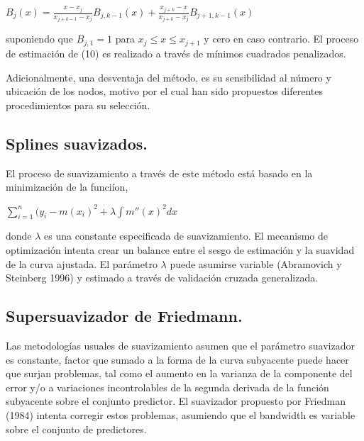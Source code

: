 \vspace*{0.2 cm}


\begin{center}
$\displaystyle{ B_{j}(x) = \frac{x-x_{j}}{x_{j+k-1}-x_{j}} B_{j,k-1}(x) + \frac{x_{j+k}-x}{x_{j+k}-x_{j}} B_{j+1,k-1}(x) }$
\end{center}

\vspace*{0.2 cm}


\noindent suponiendo que $B_{j,1}=1$ para $x_{j} \leq x \leq x_{j+1}$ y cero en caso contrario. El proceso de estimaci\'on de (10) es realizado a trav\'es de m\'inimos cuadrados penalizados.

\hspace*{0.4 cm}Adicionalmente, una desventaja del m\'etodo, es su sensibilidad al n\'umero y ubicaci\'on de los nodos, motivo por el cual han sido propuestos diferentes procedimientos para su selecci\'on.

\subsection{Splines suavizados.\\}



\hspace*{0.4 cm}El proceso de suavizamiento a trav\'es de este m\'etodo est\'a basado en la minimizaci\'on de la funci\'ion,

\begin{center}
$\displaystyle{ \sum_{i=1}^{n} (y_{i}-m(x_{i})^2 + \lambda \int m''(x)^2dx  }$
\end{center}


\noindent donde $\lambda$ es una constante especificada de suavizamiento. El mecanismo de optimizaci\'on intenta crear un balance entre el sesgo de estimaci\'on y la suavidad de la curva ajustada. El par\'ametro $\lambda$ puede asumirse variable (Abramovich y Steinberg 1996) y estimado a trav\'es de validaci\'on cruzada generalizada.

\subsection{Supersuavizador de Friedmann.\\}


\hspace*{0.4 cm} Las metodolog\'ias usuales de suavizamiento asumen que el par\'ametro suavizador es constante, factor que sumado a la forma de la curva subyacente puede hacer que surjan problemas, tal como el aumento en la varianza de la componente del error y/o a variaciones incontrolables de la segunda derivada de la funci\'on subyacente sobre el conjunto predictor. El suavizador propuesto por Friedman (1984) intenta corregir estos problemas, asumiendo que el bandwidth es variable sobre el conjunto de predictores.


